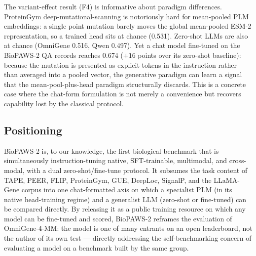 The variant-effect result (F4) is informative about paradigm differences. ProteinGym
deep-mutational-scanning is notoriously hard for mean-pooled PLM embeddings: a single point
mutation barely moves the global mean-pooled ESM-2 representation, so a trained head sits at
chance (0.531). Zero-shot LLMs are also at chance (OmniGene 0.516, Qwen 0.497). Yet a chat
model fine-tuned on the BioPAWS-2 QA records reaches 0.674 ($+16$ points over its zero-shot
baseline): because the mutation is presented as explicit tokens in the instruction rather
than averaged into a pooled vector, the generative paradigm can learn a signal that the
mean-pool-plus-head paradigm structurally discards. This is a concrete case where the
chat-form formulation is not merely a convenience but recovers capability lost by the
classical protocol.

\subsection{Positioning}

BioPAWS-2 is, to our knowledge, the first biological benchmark that is simultaneously
instruction-tuning native, SFT-trainable, multimodal, and cross-modal, with a dual
zero-shot/fine-tune protocol. It subsumes the task content of TAPE, PEER, FLIP, ProteinGym,
GUE, DeepLoc, SignalP, and the LLaMA-Gene corpus into one chat-formatted axis on which a
specialist PLM (in its native head-training regime) and a generalist LLM (zero-shot or
fine-tuned) can be compared directly. By releasing it as a public training resource on
which any model can be fine-tuned and scored, BioPAWS-2 reframes the evaluation of
OmniGene-4-MM: the model is one of many entrants on an open leaderboard, not the author of
its own test --- directly addressing the self-benchmarking concern of evaluating a model on
a benchmark built by the same group.
